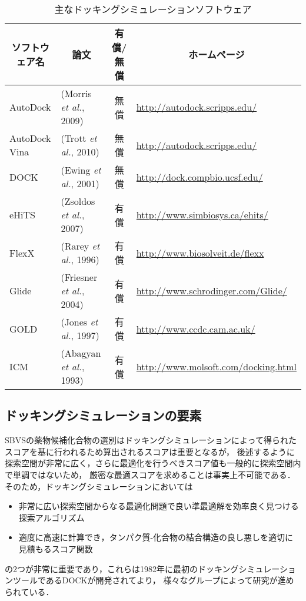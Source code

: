 \begin{table}[htb] \centering
	\caption{主なドッキングシミュレーションソフトウェア}
	\label{table:docking_tools_eg}
	\begin{tabular}{llcl}
	\hline
	\multicolumn{1}{c}{ソフトウェア名}	&\multicolumn{1}{c}{論文}			&\multicolumn{1}{c}{有償/無償}	&\multicolumn{1}{c}{ホームページ}	\\ \hline
	AutoDock					&(Morris {\it et al.}, 2009)\cite{Morris2009}												&無償									&\url{http://autodock.scripps.edu/}	\\ 
	AutoDock Vina				&(Trott  {\it et al.}, 2010)\cite{Trott2010}																											&無償									&\url{http://autodock.scripps.edu/}	\\ 
	DOCK							&(Ewing {\it et al.}, 2001)\cite{Ewing2001}																				&無償									&\url{http://dock.compbio.ucsf.edu/}	\\
	eHiTS							&(Zsoldos {\it et al.}, 2007)\cite{Zsoldos2007}											&有償									&\url{http://www.simbiosys.ca/ehits/}	\\
	FlexX							&(Rarey {\it et al.}, 1996)\cite{Rarey1996}																											&有償									&\url{http://www.biosolveit.de/flexx}	\\
	Glide							&(Friesner {\it et al.}, 2004)\cite{Friesner2004}													&有償									&\url{http://www.schrodinger.com/Glide/}	\\
	GOLD							&(Jones {\it et al.}, 1997)\cite{Jones1997}																				&有償									&\url{http://www.ccdc.cam.ac.uk/}	\\
	ICM								&(Abagyan {\it et al.}, 1993)\cite{Abagyan1993}																											&有償									&\url{http://www.molsoft.com/docking.html}	\\ \hline
	\end{tabular}
\end{table}


\subsection{ドッキングシミュレーションの要素}\label{subsec:docking_elements}
SBVSの薬物候補化合物の選別はドッキングシミュレーションによって得られたスコアを基に行われるため算出されるスコアは重要となるが，
後述するように探索空間が非常に広く，さらに最適化を行うべきスコア値も一般的に探索空間内で単調ではないため，
厳密な最適スコアを求めることは事実上不可能である．そのため，ドッキングシミュレーションにおいては
\begin{itemize}
\item 非常に広い探索空間からなる最適化問題で良い準最適解を効率良く見つける探索アルゴリズム
\item 適度に高速に計算でき，タンパク質-化合物の結合構造の良し悪しを適切に見積もるスコア関数
\end{itemize}
の2つが非常に重要であり，これらは1982年に最初のドッキングシミュレーションツールであるDOCK\cite{Kuntz1982}が開発されてより，
様々なグループによって研究が進められている．


